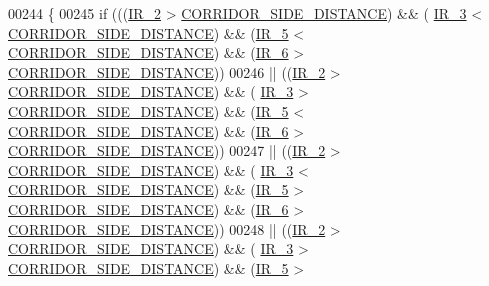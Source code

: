 \begin{DoxyCode}
00244         \{
00245             \textcolor{keywordflow}{if} (((\hyperlink{state__machine_8c_a07cfb2e201909d017a88a2a86c32cd4b}{IR\_2} > \hyperlink{state__machine_8c_a201d56046ddf552d57b4862e0ec07a10}{CORRIDOR\_SIDE\_DISTANCE}) && (
      \hyperlink{state__machine_8c_a7831b71dc250258ecefe0e23f9920688}{IR\_3} < \hyperlink{state__machine_8c_a201d56046ddf552d57b4862e0ec07a10}{CORRIDOR\_SIDE\_DISTANCE}) && (\hyperlink{state__machine_8c_ad00ba6cc1cf461bda7059f5aafc06142}{IR\_5} < 
      \hyperlink{state__machine_8c_a201d56046ddf552d57b4862e0ec07a10}{CORRIDOR\_SIDE\_DISTANCE}) && (\hyperlink{state__machine_8c_a8c51bcd8b555e8c78fea79b88d28b55e}{IR\_6} > 
      \hyperlink{state__machine_8c_a201d56046ddf552d57b4862e0ec07a10}{CORRIDOR\_SIDE\_DISTANCE}))
00246              || ((\hyperlink{state__machine_8c_a07cfb2e201909d017a88a2a86c32cd4b}{IR\_2} > \hyperlink{state__machine_8c_a201d56046ddf552d57b4862e0ec07a10}{CORRIDOR\_SIDE\_DISTANCE}) && (
      \hyperlink{state__machine_8c_a7831b71dc250258ecefe0e23f9920688}{IR\_3} > \hyperlink{state__machine_8c_a201d56046ddf552d57b4862e0ec07a10}{CORRIDOR\_SIDE\_DISTANCE}) && (\hyperlink{state__machine_8c_ad00ba6cc1cf461bda7059f5aafc06142}{IR\_5} < 
      \hyperlink{state__machine_8c_a201d56046ddf552d57b4862e0ec07a10}{CORRIDOR\_SIDE\_DISTANCE}) && (\hyperlink{state__machine_8c_a8c51bcd8b555e8c78fea79b88d28b55e}{IR\_6} > 
      \hyperlink{state__machine_8c_a201d56046ddf552d57b4862e0ec07a10}{CORRIDOR\_SIDE\_DISTANCE}))
00247              || ((\hyperlink{state__machine_8c_a07cfb2e201909d017a88a2a86c32cd4b}{IR\_2} > \hyperlink{state__machine_8c_a201d56046ddf552d57b4862e0ec07a10}{CORRIDOR\_SIDE\_DISTANCE}) && (
      \hyperlink{state__machine_8c_a7831b71dc250258ecefe0e23f9920688}{IR\_3} < \hyperlink{state__machine_8c_a201d56046ddf552d57b4862e0ec07a10}{CORRIDOR\_SIDE\_DISTANCE}) && (\hyperlink{state__machine_8c_ad00ba6cc1cf461bda7059f5aafc06142}{IR\_5} > 
      \hyperlink{state__machine_8c_a201d56046ddf552d57b4862e0ec07a10}{CORRIDOR\_SIDE\_DISTANCE}) && (\hyperlink{state__machine_8c_a8c51bcd8b555e8c78fea79b88d28b55e}{IR\_6} > 
      \hyperlink{state__machine_8c_a201d56046ddf552d57b4862e0ec07a10}{CORRIDOR\_SIDE\_DISTANCE}))
00248              || ((\hyperlink{state__machine_8c_a07cfb2e201909d017a88a2a86c32cd4b}{IR\_2} > \hyperlink{state__machine_8c_a201d56046ddf552d57b4862e0ec07a10}{CORRIDOR\_SIDE\_DISTANCE}) && (
      \hyperlink{state__machine_8c_a7831b71dc250258ecefe0e23f9920688}{IR\_3} > \hyperlink{state__machine_8c_a201d56046ddf552d57b4862e0ec07a10}{CORRIDOR\_SIDE\_DISTANCE}) && (\hyperlink{state__machine_8c_ad00ba6cc1cf461bda7059f5aafc06142}{IR\_5} > 

\end{DoxyCode}
